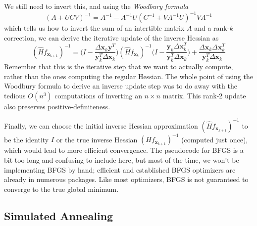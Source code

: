 \documentclass{article}
\begin{document}
    We still need to invert this, and using the \textit{Woodbury formula}
    \[(A + U C V)^{-1} = A^{-1} - A^{-1} U (C^{-1} + V A^{-1} U)^{-1} V A^{-1}\]
    which tells us how to invert the sum of an intertible matrix $A$ and a rank-$k$ correction, we can derive the iterative update of the inverse Hessian as 
    \[(\hat{H} f_{\mathbf{x}_{k+1}})^{-1} = \bigg( I - \frac{\Delta \mathbf{x}_k \mathbf{y}^T}{\mathbf{y}_k^T \Delta \mathbf{x}_k}\bigg) (\hat{H} f_{\mathbf{x}_{k}})^{-1} \bigg( I - \frac{\mathbf{y}_k \Delta \mathbf{x}_k^T}{\mathbf{y}_k^T \Delta \mathbf{x}_k}\bigg) + \frac{\Delta \mathbf{x}_k \Delta \mathbf{x}_k^T}{\mathbf{y}_k^T \Delta \mathbf{x}_k}\]
    Remember that this is the iterative step that we want to actually compute, rather than the ones computing the regular Hessian. The whole point of using the Woodbury formula to derive an inverse update step was to do away with the tedious $O(n^3)$ computations of inverting an $n \times n$ matrix. This rank-2 update also preserves positive-definiteness. 

    Finally, we can choose the initial inverse Hessian approximation $(\hat{H} f_{\mathbf{x}_{k+1}})^{-1}$ to be the identity $I$ or the true inverse Hessian $(H f_{\mathbf{x}_{k+1}})^{-1}$ (computed just once), which would lead to more efficient convergence. The pseudocode for BFGS is a bit too long and confusing to include here, but most of the time, we won't be implementing BFGS by hand; efficient and established BFGS optimizers are already in numerous packages. Like most optimizers, BFGS is not guaranteed to converge to the true global minimum. 

    \subsection{Simulated Annealing}
\end{document}
